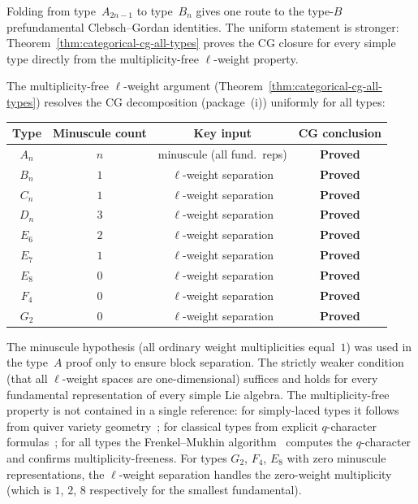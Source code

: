 \begin{remark}
\label{rem:mc3-type-b-folding}
Folding from type~$A_{2n-1}$ to type~$B_n$ gives one route to the
type-$B$ prefundamental Clebsch--Gordan identities. The uniform
statement is stronger: Theorem~\ref{thm:categorical-cg-all-types}
proves the CG closure for every simple type directly from the
multiplicity-free $\ell$-weight property.
\end{remark}

\begin{remark}
\label{rem:mc3-difficulty-gradient}
The multiplicity-free $\ell$-weight argument
(Theorem~\ref{thm:categorical-cg-all-types}) resolves the CG
decomposition \textup{(}package~\textup{(i)}\textup{)} uniformly
for all types:
\begin{center}
\begin{tabular}{cccc}
\toprule
Type & Minuscule count & Key input & CG conclusion \\
\midrule
$A_n$ & $n$ & minuscule (all fund.\ reps) & \textbf{Proved} \\
$B_n$ & $1$ & $\ell$-weight separation & \textbf{Proved} \\
$C_n$ & $1$ & $\ell$-weight separation & \textbf{Proved} \\
$D_n$ & $3$ & $\ell$-weight separation & \textbf{Proved} \\
$E_6$ & $2$ & $\ell$-weight separation & \textbf{Proved} \\
$E_7$ & $1$ & $\ell$-weight separation & \textbf{Proved} \\
$E_8$ & $0$ & $\ell$-weight separation & \textbf{Proved} \\
$F_4$ & $0$ & $\ell$-weight separation & \textbf{Proved} \\
$G_2$ & $0$ & $\ell$-weight separation & \textbf{Proved} \\
\bottomrule
\end{tabular}
\end{center}
The minuscule hypothesis (all ordinary weight multiplicities
equal~$1$) was used in the type~$A$ proof only to ensure block
separation. The strictly weaker condition (that all
$\ell$-weight spaces are one-dimensional) suffices and holds
for every fundamental representation of every simple Lie algebra.
The multiplicity-free property is not contained in a single
reference: for simply-laced types it follows from quiver variety
geometry~\cite{Nakajima04}; for classical types from explicit
$q$-character formulas~\cite{ChariMoura06}; for all types the
Frenkel--Mukhin algorithm~\cite{FrenkelMukhin01} computes the
$q$-character and confirms multiplicity-freeness.
For types $G_2$, $F_4$, $E_8$ with zero minuscule
representations, the $\ell$-weight separation handles the
zero-weight multiplicity (which is $1$, $2$, $8$ respectively
for the smallest fundamental).
\end{remark}

